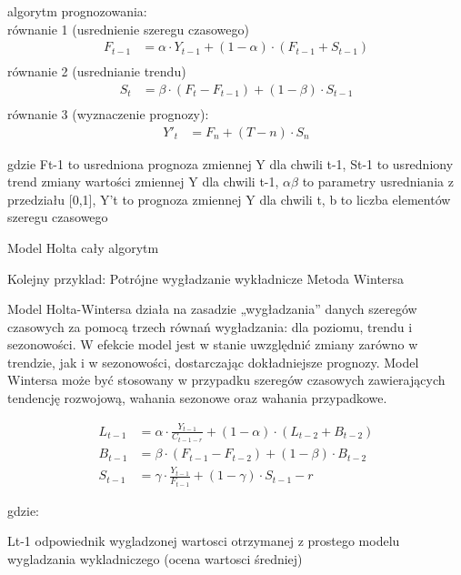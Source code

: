 algorytm prognozowania:\\
równanie 1 (usrednienie szeregu czasowego)\\
\begin{align*}
F_{t-1} & = \alpha \cdot Y_{t-1} + (1 - \alpha) \cdot (F_{t-1} + S_{t-1}) \\
\end{align*}
równanie 2 (usrednianie trendu)\\
\begin{align*}
S_t & = \beta \cdot (F_t - F_{t-1}) + (1 - \beta) \cdot S_{t-1} \\
\end{align*}
równanie 3 (wyznaczenie prognozy):\\
\begin{align*}
Y'_t & = F_n + (T - n) \cdot S_n
\end{align*}

gdzie Ft-1 to usredniona prognoza zmiennej Y dla chwili t-1, St-1 to usredniony trend zmiany wartości zmiennej Y dla chwili t-1, \(\alpha  \beta\) to parametry usredniania z przedziału [0,1], Y't to prognoza zmiennej Y dla chwili t, b to liczba elementów szeregu czasowego

Model Holta  cały algorytm\cite{szer2009}


Kolejny przyklad: Potrójne wygładzanie wykładnicze Metoda Wintersa

Model Holta-Wintersa działa na zasadzie „wygładzania” danych szeregów czasowych za pomocą trzech równań wygładzania: dla poziomu, trendu i sezonowości. W efekcie model jest w stanie uwzględnić zmiany zarówno w trendzie, jak i w sezonowości, dostarczając dokładniejsze prognozy.\cite{exc2018}
Model Wintersa może być stosowany w przypadku szeregów czasowych zawierających tendencję rozwojową, wahania sezonowe oraz wahania przypadkowe. \cite{win2023}





\begin{align*}
L_{t-1} & = \alpha \cdot \frac{Y_{t-1}}{C_{t-1-r}} + (1 - \alpha) \cdot (L_{t-2} + B_{t-2}) \\
B_{t-1} & = \beta \cdot (F_{t-1} - F_{t-2}) + (1 - \beta) \cdot B_{t-2} \\
S_{t-1} & = \gamma \cdot \frac{Y_{t-1}}{F_{t-1}} + (1 - \gamma) \cdot S_{t-1} - r
\end{align*}

gdzie:

Lt-1 odpowiednik wygladzonej wartosci otrzymanej z prostego modelu wygladzania wykladniczego (ocena wartosci średniej)

